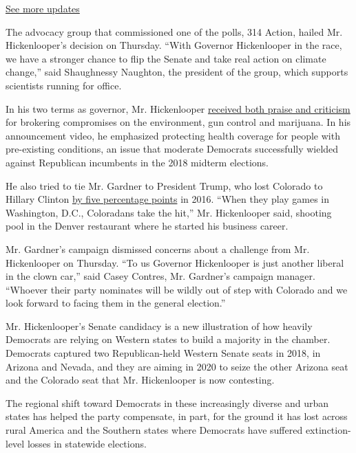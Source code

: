 \href{https://www.nytimes.com/2020/07/31/us/elections/biden-vs-trump.html?action=click\&pgtype=Article\&state=default\&region=MAIN_CONTENT_1\&context=storylines_live_updates}{See
more updates}

The advocacy group that commissioned one of the polls, 314 Action,
hailed Mr. Hickenlooper's decision on Thursday. ``With Governor
Hickenlooper in the race, we have a stronger chance to flip the Senate
and take real action on climate change,'' said Shaughnessy Naughton, the
president of the group, which supports scientists running for office.

In his two terms as governor, Mr. Hickenlooper
\href{https://www.nytimes.com/2019/04/28/us/john-hickenlooper.html}{received
both praise and criticism} for brokering compromises on the environment,
gun control and marijuana. In his announcement video, he emphasized
protecting health coverage for people with pre-existing conditions, an
issue that moderate Democrats successfully wielded against Republican
incumbents in the 2018 midterm elections.

He also tried to tie Mr. Gardner to President Trump, who lost Colorado
to Hillary Clinton
\href{https://www.nytimes.com/elections/2016/results/colorado}{by five
percentage points} in 2016. ``When they play games in Washington, D.C.,
Coloradans take the hit,'' Mr. Hickenlooper said, shooting pool in the
Denver restaurant where he started his business career.

Mr. Gardner's campaign dismissed concerns about a challenge from Mr.
Hickenlooper on Thursday. ``To us Governor Hickenlooper is just another
liberal in the clown car,'' said Casey Contres, Mr. Gardner's campaign
manager. ``Whoever their party nominates will be wildly out of step with
Colorado and we look forward to facing them in the general election.''

Mr. Hickenlooper's Senate candidacy is a new illustration of how heavily
Democrats are relying on Western states to build a majority in the
chamber. Democrats captured two Republican-held Western Senate seats in
2018, in Arizona and Nevada, and they are aiming in 2020 to seize the
other Arizona seat and the Colorado seat that Mr. Hickenlooper is now
contesting.

The regional shift toward Democrats in these increasingly diverse and
urban states has helped the party compensate, in part, for the ground it
has lost across rural America and the Southern states where Democrats
have suffered extinction-level losses in statewide elections.

